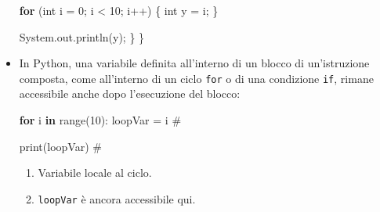 \documentclass[
  letterpaper,
]{scrbook}
\newenvironment{Shaded}{\begin{snugshade}}{\end{snugshade}}
\newcommand{\BuiltInTok}[1]{\textcolor[rgb]{0.00,0.23,0.31}{#1}}
\newcommand{\CommentTok}[1]{\textcolor[rgb]{0.37,0.37,0.37}{#1}}
\newcommand{\ControlFlowTok}[1]{\textcolor[rgb]{0.00,0.23,0.31}{\textbf{#1}}}
\newcommand{\DataTypeTok}[1]{\textcolor[rgb]{0.68,0.00,0.00}{#1}}
\newcommand{\DecValTok}[1]{\textcolor[rgb]{0.68,0.00,0.00}{#1}}
\newcommand{\FunctionTok}[1]{\textcolor[rgb]{0.28,0.35,0.67}{#1}}
\newcommand{\KeywordTok}[1]{\textcolor[rgb]{0.00,0.23,0.31}{\textbf{#1}}}
\newcommand{\NormalTok}[1]{\textcolor[rgb]{0.00,0.23,0.31}{#1}}
\newcommand{\OperatorTok}[1]{\textcolor[rgb]{0.37,0.37,0.37}{#1}}
\providecommand{\tightlist}{%
  \setlength{\itemsep}{0pt}\setlength{\parskip}{0pt}}\usepackage{longtable,booktabs,array}
\newcommand*\circled[1]{\tikz[baseline=(char.base)]{
          \node[shape=circle,draw,inner sep=1pt] (char) {{\scriptsize#1}};}}
\begin{document}
\begin{itemize}
\begin{Shaded}
\begin{Highlighting}[]
    \ControlFlowTok{for} \OperatorTok{(}\DataTypeTok{int}\NormalTok{ i }\OperatorTok{=} \DecValTok{0}\OperatorTok{;}\NormalTok{ i }\OperatorTok{\textless{}} \DecValTok{10}\OperatorTok{;}\NormalTok{ i}\OperatorTok{++)} \OperatorTok{\{}
      \DataTypeTok{int}\NormalTok{ y }\OperatorTok{=}\NormalTok{ i}\OperatorTok{;} \hspace*{\fill}\NormalTok{\circled{3}}
    \OperatorTok{\}}

    \BuiltInTok{System}\OperatorTok{.}\FunctionTok{out}\OperatorTok{.}\FunctionTok{println}\OperatorTok{(}\NormalTok{y}\OperatorTok{);} \hspace*{\fill}\NormalTok{\circled{4}}
  \OperatorTok{\}}
\OperatorTok{\}}
\end{Highlighting}
\end{Shaded}

\item
  In Python, una variabile definita all'interno di un blocco di
  un'istruzione composta, come all'interno di un ciclo \texttt{for} o di
  una condizione \texttt{if}, rimane accessibile anche dopo l'esecuzione
  del blocco:

\begin{Shaded}
\begin{Highlighting}[]
\ControlFlowTok{for}\NormalTok{ i }\KeywordTok{in} \BuiltInTok{range}\NormalTok{(}\DecValTok{10}\NormalTok{):}
\NormalTok{  loopVar }\OperatorTok{=}\NormalTok{ i  }\CommentTok{\# }

\BuiltInTok{print}\NormalTok{(loopVar)  }\CommentTok{\# }
\end{Highlighting}
\end{Shaded}

  \begin{enumerate}
  \def\labelenumi{\arabic{enumi}.}
  \tightlist
  \item
    Variabile locale al ciclo.
  \item
    \texttt{loopVar} è ancora accessibile qui.
  \end{enumerate}
\end{itemize}
\end{document}
